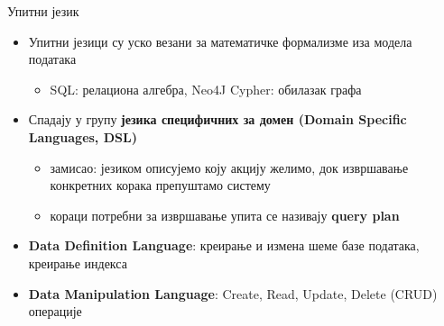 \documentclass{beamer}
\begin{document}
    \begin{frame}{Упитни језик}
        \begin{itemize}
            \item Упитни језици су уско везани за математичке формализме иза модела података
            \begin{itemize}
                \item SQL: релациона алгебра, Neo4J Cypher: обилазак графа
            \end{itemize}
            \item Спадају у групу \textbf{језика специфичних за домен (Domain Specific Languages, DSL)}
            \begin{itemize}
                \item замисао: језиком описујемо коју акцију желимо, док извршавање конкретних корака препуштамо систему
                \item кораци потребни за извршавање упита се називају \textbf{query plan}
            \end{itemize}
            \item \textbf{Data Definition Language}: креирање и измена шеме базе података, креирање индекса
            \item \textbf{Data Manipulation Language}: Create, Read, Update, Delete (CRUD) операције
        \end{itemize}
    \end{frame}
    
\end{document}

